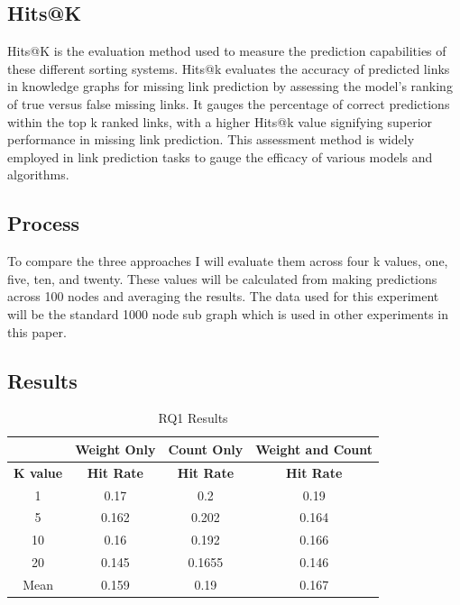 \documentclass{l4proj}
\begin{document}
\subsection{Hits@K}

Hits@K is the evaluation method used to measure the prediction capabilities of these different sorting systems. Hits@k evaluates the accuracy of predicted links in knowledge graphs for missing link prediction by assessing the model's ranking of true versus false missing links. It gauges the percentage of correct predictions within the top k ranked links, with a higher Hits@k value signifying superior performance in missing link prediction. This assessment method is widely employed in link prediction tasks to gauge the efficacy of various models and algorithms. \\

\subsection{Process}

To compare the three approaches I will evaluate them across four k values, one, five, ten, and twenty. These values will be calculated from making predictions across 100 nodes and averaging the results. The data used for this experiment will be the standard 1000 node sub graph which is used in other experiments in this paper.\\

\subsection{Results}

\begin{table}[h]
    \centering
    \caption{RQ1 Results}
    \label{tab:rq1_results}
    \begin{tabular}{|c|c|c|c|}
    \hline
    & \textbf{Weight Only} & \textbf{Count Only} &\textbf{Weight and Count} \\ \hline
    \textbf{K value} & \textbf{Hit Rate} & \textbf{Hit Rate} & \textbf{Hit Rate}\\ \hline
    1 & 0.17 & 0.2 & 0.19 \\ \hline
    5 & 0.162 & 0.202 & 0.164\\ \hline
    10 & 0.16 & 0.192 & 0.166 \\ \hline
    20 & 0.145 &0.1655 & 0.146\\ \hline
    Mean & 0.159 & 0.19 & 0.167 \\ \hline
    \end{tabular}
\end{table}
\end{document}
